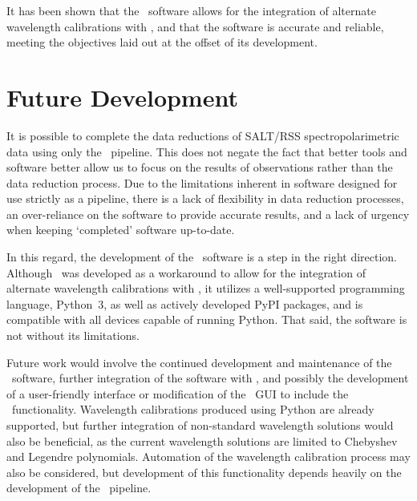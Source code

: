 It has been shown that the \stops\ software allows for the integration of alternate wavelength calibrations with \polsalt, and that the software is accurate and reliable, meeting the objectives laid out at the offset of its development.

\section{Future Development} \label{sec:future}

It is possible to complete the data reductions of \gls{SALT}/\gls{RSS} spectropolarimetric data using only the \polsalt\ pipeline.
This does not negate the fact that better tools and software better allow us to focus on the results of observations rather than the data reduction process.
Due to the limitations inherent in software designed for use strictly as a pipeline, there is a lack of flexibility in data reduction processes, an over-reliance on the software to provide accurate results, and a lack of urgency when keeping `completed' software up-to-date.

In this regard, the development of the \stops\ software is a step in the right direction.
Although \stops\ was developed as a workaround to allow for the integration of alternate wavelength calibrations with \polsalt, it utilizes a well-supported programming language, Python~$3$, as well as actively developed \gls{PyPI} packages, and is compatible with all devices capable of running Python.
That said, the software is not without its limitations.

Future work would involve the continued development and maintenance of the \stops\ software, further integration of the software with \polsalt, and possibly the development of a user-friendly interface or modification of the \polsalt\ \gls{GUI} to include the \stops\ functionality.
Wavelength calibrations produced using Python are already supported, but further integration of non-standard wavelength solutions would also be beneficial, as the current wavelength solutions are limited to Chebyshev and Legendre polynomials.
Automation of the wavelength calibration process may also be considered, but development of this functionality depends heavily on the development of the \polsalt\ pipeline.
